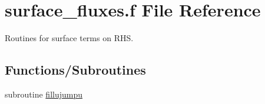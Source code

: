 \hypertarget{surface__fluxes_8f}{\section{surface\-\_\-fluxes.\-f File Reference}
\label{surface__fluxes_8f}
}


Routines for surface terms on R\-H\-S.  


\subsection*{Functions/\-Subroutines}
\begin{DoxyCompactItemize}
\item 
\hypertarget{group__isurf_gaecf15d43e4c71d130e4ef9e4a6a7821a}{subroutine \hyperlink{group__isurf_gaecf15d43e4c71d130e4ef9e4a6a7821a}{fillujumpu}}\label{group__isurf_gaecf15d43e4c71d130e4ef9e4a6a7821a}


\end{DoxyCompactItemize}
